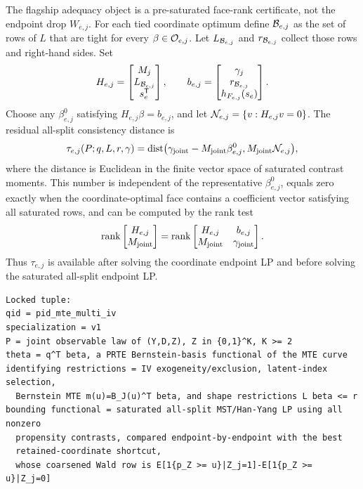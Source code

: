 \documentclass[11pt]{article}
\newcommand{\transpose}{\mathsf{T}}
\theoremstyle{definition}
\theoremstyle{plain}
\theoremstyle{remark}
\begin{document}
The flagship adequacy object is a pre-saturated face-rank certificate, not the
endpoint drop \(W_{e,j}\).  For each tied coordinate optimum define
\({\cal B}_{e,j}\) as the set of rows of \(L\) that are tight for every
\(\beta\in{\cal O}_{e,j}\).  Let \(L_{{\cal B}_{e,j}}\) and
\(r_{{\cal B}_{e,j}}\) collect those rows and right-hand sides.  Set
\[
H_{e,j}=\begin{bmatrix}M_j\\ L_{{\cal B}_{e,j}}\\ s_e^\transpose\end{bmatrix},
\qquad
b_{e,j}=\begin{bmatrix}\gamma_j\\ r_{{\cal B}_{e,j}}\\
h_{F_{e,j}}(s_e)\end{bmatrix}.
\]
Choose any \(\beta^0_{e,j}\) satisfying \(H_{e,j}\beta=b_{e,j}\), and let
\({\cal N}_{e,j}=\{v:H_{e,j}v=0\}\).  The residual all-split consistency
distance is
\[
\tau_{e,j}(P;q,L,r,\gamma)=
\operatorname{dist}\bigl(\gamma_{\rm joint}-M_{\rm joint}\beta^0_{e,j},
M_{\rm joint}{\cal N}_{e,j}\bigr),
\]
where the distance is Euclidean in the finite vector space of saturated
contrast moments.  This number is independent of the representative
\(\beta^0_{e,j}\), equals zero exactly when the coordinate-optimal face
contains a coefficient vector satisfying all saturated rows, and can be
computed by the rank test
\[
\operatorname{rank}\begin{bmatrix}H_{e,j}\\ M_{\rm joint}\end{bmatrix}
=
\operatorname{rank}\begin{bmatrix}H_{e,j}&b_{e,j}\\
M_{\rm joint}&\gamma_{\rm joint}\end{bmatrix}.
\]
Thus \(\tau_{e,j}\) is available after solving the coordinate endpoint LP and
before solving the saturated all-split endpoint LP.

\begin{verbatim}
Locked tuple:
qid = pid_mte_multi_iv
specialization = v1
P = joint observable law of (Y,D,Z), Z in {0,1}^K, K >= 2
theta = q^T beta, a PRTE Bernstein-basis functional of the MTE curve
identifying restrictions = IV exogeneity/exclusion, latent-index selection,
  Bernstein MTE m(u)=B_J(u)^T beta, and shape restrictions L beta <= r
bounding functional = saturated all-split MST/Han-Yang LP using all nonzero
  propensity contrasts, compared endpoint-by-endpoint with the best
  retained-coordinate shortcut,
  whose coarsened Wald row is E[1{p_Z >= u}|Z_j=1]-E[1{p_Z >= u}|Z_j=0]
\end{verbatim}
\end{document}
